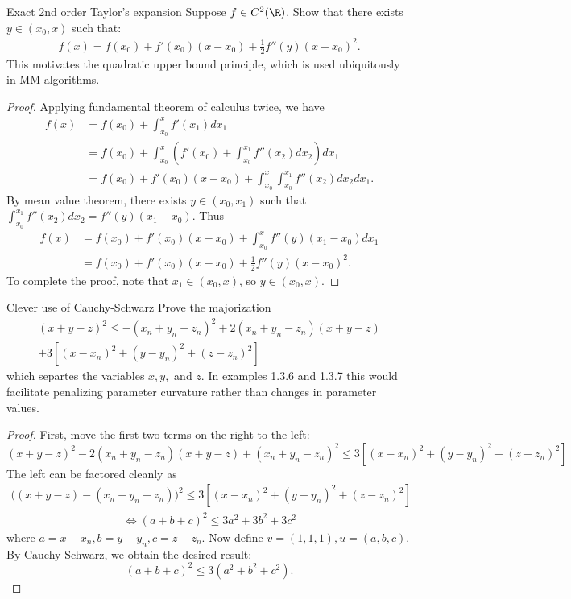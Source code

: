 \begin{problembox}{Exact 2nd order Taylor's expansion}{}
Suppose $f \in C^{2}(\R)$. Show that there exists $y \in (x_0, x)$ such that:
\begin{align*}
f(x) = f(x_0) + f'(x_0)(x - x_0) + \frac{1}{2} f''(y)(x - x_0)^2.
\end{align*}
This motivates the quadratic upper bound principle, which is used ubiquitously in MM algorithms.
\end{problembox}

\begin{proof}
Applying fundamental theorem of calculus twice, we have
\begin{align*}
	f(x) 
	&= f(x_0) + \int_{x_0}^x f'(x_1) dx_1\\
	&=f(x_0) + \int_{x_0}^x \left(f'(x_0) + \int_{x_0}^{x_1} f''(x_2)dx_2 \right)dx_1\\
	&= f(x_0) + f'(x_0)(x - x_0) + \int_{x_0}^x\int_{x_0}^{x_1}f''(x_2)dx_2dx_1.
\end{align*}
By mean value theorem, there exists $y \in (x_0, x_1)$ such that $\int_{x_0}^{x_1}f''(x_2)dx_2 = f''(y)(x_1 - x_0).$ Thus
\begin{align*}
	f(x)
	&= f(x_0) + f'(x_0)(x - x_0) +\int_{x_0}^x f''(y)(x_1 - x_0)dx_1\\
	&= f(x_0) + f'(x_0)(x - x_0) + \frac{1}{2}f''(y)(x - x_0)^2.
\end{align*}
To complete the proof, note that $x_1 \in (x_0, x)$, so $y \in (x_0, x)$.
\end{proof}

\begin{problembox}{Clever use of Cauchy-Schwarz \hfill {\small \cite[Exercise 1.4.18]{lange2016mm}}}{}
Prove the majorization
\begin{equation*}
\begin{split}
(x + y - z)^2 \leq -(x_n + y_n - z_n)^2 + 2(x_n + y_n-z_n)(x+y-z) \\
+ 3[(x-x_n)^2 + (y-y_n)^2 + (z-z_n)^2]
\end{split}
\end{equation*}
which separtes the variables $x, y, $ and $z$. In examples 1.3.6 and 1.3.7 this would facilitate penalizing parameter curvature rather than changes in parameter values. 
\end{problembox}

\begin{proof}
First, move the first two terms on the right to the left: 
$$(x + y - z)^2 - 2(x_n + y_n-z_n)(x+y-z) + (x_n + y_n - z_n)^2 \leq 3[(x-x_n)^2 + (y-y_n)^2 + (z-z_n)^2]$$
The left can be factored cleanly as
\begin{align*}
\big( (x + y - z) - (x_n + y_n - z_n)\big)^2 \leq 3[(x-x_n)^2 + (y-y_n)^2 + (z-z_n)^2]
\end{align*}
\begin{align*}
\iff (a + b + c)^2 \leq 3a^2 + 3b^2 + 3c^2
\end{align*}
where $a = x - x_n, b = y - y_n, c = z - z_n.$ Now define $v = (1, 1, 1), u = (a, b, c).$ By Cauchy-Schwarz, we obtain the desired result:
$$(a + b + c)^2 \leq 3 (a^2 + b^2 + c^2).$$
\end{proof}
